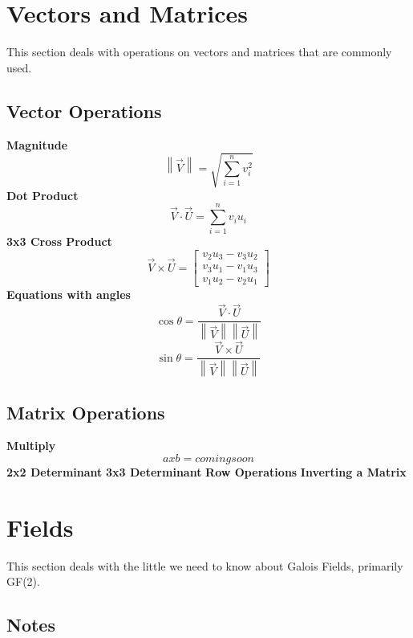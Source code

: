 \section{Vectors and Matrices}
This section deals with operations on vectors and matrices that are commonly used.
\subsection{Vector Operations}
	\textbf{Magnitude}
	\begin{equation}
	\left\|   \vec{V} \right\|  = \sqrt{\sum_{i=1}^{n} v_i^2}
	\end{equation}
	\textbf{Dot Product}
	\begin{equation}
	\vec{V} \cdot \vec{U} = \sum_{i=1}^{n} v_iu_i
	\end{equation}
	\textbf{3x3 Cross Product}
\begin{equation}
	\vec{V} \times \vec{U} = \begin{bmatrix}
		v_2u_3 - v_3u_2\\ 
		v_3u_1 - v_1u_3\\ 
		v_1u_2 - v_2u_1
	\end{bmatrix}
\end{equation}
	\textbf{Equations with angles}
		\begin{equation}
		\cos{\theta} = \frac{\vec{V} \cdot \vec{U}}{\left\| \vec{V} \right\| \left\| \vec{U} \right\| }
		\end{equation}
		\begin{equation}
		\sin{\theta} = \frac{\vec{V} \times \vec{U}}{\left\| \vec{V} \right\| \left\| \vec{U} \right\| }
		\end{equation}
\subsection{Matrix Operations}
\textbf{Multiply}
\begin{equation}
a x b = coming soon
\end{equation}
\textbf{2x2 Determinant}
\textbf{3x3 Determinant}
\textbf{Row Operations}
\textbf{Inverting a Matrix}
\newpage
\section{Fields}
This section deals with the little we need to know about Galois Fields, primarily GF(2).
\subsection{Notes}

